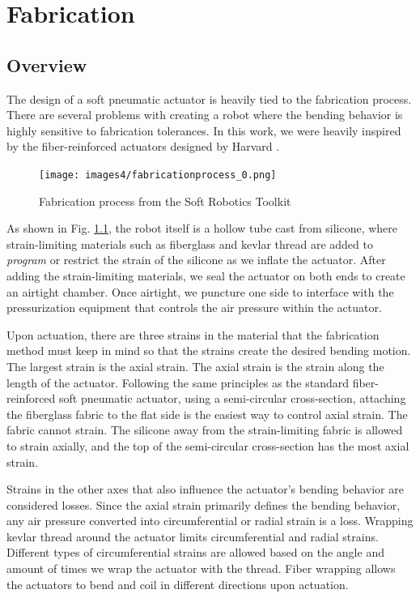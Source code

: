 \chapter{Fabrication}

\section{Overview}
The design of a soft pneumatic actuator is heavily tied to the fabrication process. There are several problems with creating a robot where the bending behavior is highly sensitive to fabrication tolerances. In this work, we were heavily inspired by the fiber-reinforced actuators designed by Harvard \cite{galloway_mechanically_2013}. 

\begin{figure}[h]
    \centering
    \texttt{[image: images4/fabricationprocess\_0.png]}
    \caption{Fabrication process from the Soft Robotics Toolkit}
    \label{fig:toolkitfab}
\end{figure}

As shown in Fig. \ref{fig:toolkitfab}, the robot itself is a hollow tube cast from silicone, where strain-limiting materials such as fiberglass and kevlar thread are added to \emph{program} or restrict the strain of the silicone as we inflate the actuator. After adding the strain-limiting materials, we seal the actuator on both ends to create an airtight chamber. Once airtight, we puncture one side to interface with the pressurization equipment that controls the air pressure within the actuator. 

Upon actuation, there are three strains in the material that the fabrication method must keep in mind so that the strains create the desired bending motion. The largest strain is the axial strain. The axial strain is the strain along the length of the actuator. Following the same principles as the standard fiber-reinforced soft pneumatic actuator, using a semi-circular cross-section, attaching the fiberglass fabric to the flat side is the easiest way to control axial strain. The fabric cannot strain. The silicone away from the strain-limiting fabric is allowed to strain axially, and the top of the semi-circular cross-section has the most axial strain. 

Strains in the other axes that also influence the actuator's bending behavior are considered losses. Since the axial strain primarily defines the bending behavior, any air pressure converted into circumferential or radial strain is a loss. Wrapping kevlar thread around the actuator limits circumferential and radial strains. Different types of circumferential strains are allowed based on the angle and amount of times we wrap the actuator with the thread. Fiber wrapping allows the actuators to bend and coil in different directions upon actuation. 

